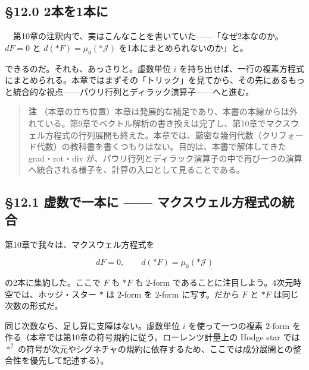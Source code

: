 \documentclass[a4paper,12pt,openany]{book}
\begin{document}
\hypertarget{ux672cux30921ux672cux306b}{%
\subsection{§12.0 2本を1本に}\label{ux672cux30921ux672cux306b}}

　第10章の注釈内で、実はこんなことを書いていた——「なぜ2本なのか。\(dF=0\)
と \(d(\ast F)=\mu_0(\ast\mathcal{J})\) を1本にまとめられないのか」と。

できるのだ。それも、あっさりと。虚数単位 \(i\)
を持ち出せば、一行の複素方程式にまとめられる。本章ではまずその「トリック」を見てから、その先にあるもっと統合的な視点——パウリ行列とディラック演算子——へと進む。

\begin{quote}
\textbf{注}
（本章の立ち位置）本章は発展的な補足であり、本書の本線からは外れている。第9章でベクトル解析の書き換えは完了し、第10章でマクスウェル方程式の行列展開も終えた。本章では、厳密な幾何代数（クリフォード代数）の教科書を書くつもりはない。目的は、本書で解体してきた
grad・rot・div
が、パウリ行列とディラック演算子の中で再び一つの演算へ統合される様子を、計算の入口として見ることである。
\end{quote}

\par\vspace{0.35em}\par

\hypertarget{ux865aux6570ux3067ux4e00ux672cux306b-ux30deux30afux30b9ux30a6ux30a7ux30ebux65b9ux7a0bux5f0fux306eux7d71ux5408}{%
\subsection{§12.1 虚数で一本に ——
マクスウェル方程式の統合}\label{ux865aux6570ux3067ux4e00ux672cux306b-ux30deux30afux30b9ux30a6ux30a7ux30ebux65b9ux7a0bux5f0fux306eux7d71ux5408}}

第10章で我々は、マクスウェル方程式を

\[dF = 0, \qquad d(\ast F) = \mu_0(\ast\mathcal{J})\]

の2本に集約した。ここで \(F\) も \(\ast F\) も \(2\)-form
であることに注目しよう。4次元時空では、ホッジ・スター \(\ast\) は
\(2\)-form を \(2\)-form に写す。だから \(F\) と \(\ast F\)
は同じ次数の形式だ。

同じ次数なら、足し算に支障はない。虚数単位 \(i\) を使って一つの複素
\(2\)-form を作る（本章では第10章の符号規約に従う。ローレンツ計量上の
Hodge star では \(\ast^2\)
の符号が次元やシグネチャの規約に依存するため、ここでは成分展開との整合性を優先して記述する）。
\end{document}
